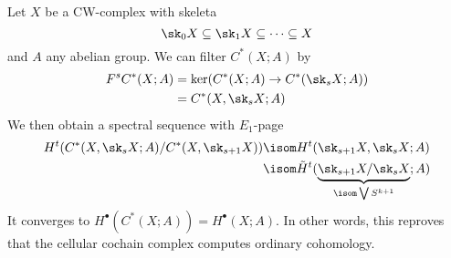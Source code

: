 \documentclass[wip, topology]{bsteffan-lecturenotes}
\begin{document}
\begin{example}\label{epl:cwfiltration}
	Let $X$ be a CW-complex with skeleta
	\begin{equation*}
		\sk_0 X \subseteq \sk_1 X \subseteq \cdots \subseteq X
	\end{equation*}
	and $A$ any abelian group.
	We can filter $C^*(X; A)$ by
	\begin{align*}
		F^s C^*(X; A) &= \ker(C^*(X; A) \to C^*(\sk_s X; A)) \\
					  &= C^*(X, \sk_s X; A)
	\end{align*}
	We then obtain a spectral sequence with $E_1$-page
	\begin{align*}
		H^t(C^*(X, \sk_s X; A) / C^*(X, \sk_{s + 1} X)) &\isom H^t(\sk_{s + 1} X, \sk_s X; A) \\
													  &\isom \tilde{H}^t(\underbrace{\sk_{s + 1} X / \sk_s X}_{\isom \bigvee S^{k + 1}}; A)
	\end{align*}
	It converges to $H^\bullet(C^*(X; A)) = H^\bullet(X; A)$.
	In other words, this reproves that the cellular cochain complex computes ordinary cohomology.
\end{example}
\end{document}
